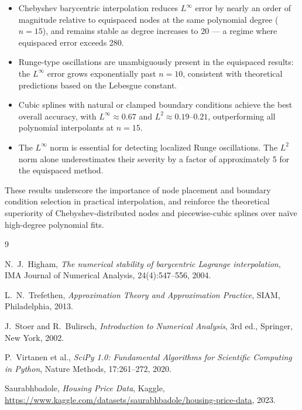 \documentclass[11pt]{article}
\begin{document}
\begin{itemize}
  \item Chebyshev barycentric interpolation reduces $L^\infty$ error by
        nearly an order of magnitude relative to equispaced nodes at the same
        polynomial degree ($n=15$), and remains stable as degree increases to
        20 --- a regime where equispaced error exceeds 280.

  \item Runge-type oscillations are unambiguously present in the equispaced
        results: the $L^\infty$ error grows exponentially past $n=10$,
        consistent with theoretical predictions based on the Lebesgue
        constant.

  \item Cubic splines with natural or clamped boundary conditions achieve the
        best overall accuracy, with $L^\infty \approx 0.67$ and $L^2 \approx
        0.19$--$0.21$, outperforming all polynomial interpolants at $n=15$.

  \item The $L^\infty$ norm is essential for detecting localized Runge
        oscillations.  The $L^2$ norm alone underestimates their severity by
        a factor of approximately 5 for the equispaced method.
\end{itemize}

These results underscore the importance of node placement and boundary
condition selection in practical interpolation, and reinforce the theoretical
superiority of Chebyshev-distributed nodes and piecewise-cubic splines over
na\"ive high-degree polynomial fits.

\begin{thebibliography}{9}

N.~J.~Higham,
\emph{The numerical stability of barycentric Lagrange interpolation},
IMA Journal of Numerical Analysis, 24(4):547--556, 2004.

L.~N.~Trefethen,
\emph{Approximation Theory and Approximation Practice},
SIAM, Philadelphia, 2013.

J.~Stoer and R.~Bulirsch,
\emph{Introduction to Numerical Analysis}, 3rd ed.,
Springer, New York, 2002.

P.~Virtanen et al.,
\emph{SciPy 1.0: Fundamental Algorithms for Scientific Computing in Python},
Nature Methods, 17:261--272, 2020.

Saurabhbadole,
\emph{Housing Price Data},
Kaggle, \url{https://www.kaggle.com/datasets/saurabhbadole/housing-price-data},
2023.

\end{thebibliography}
\end{document}
